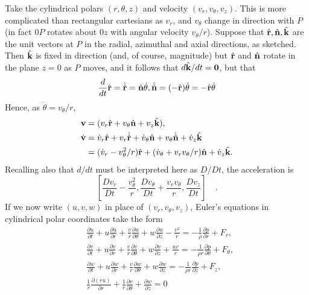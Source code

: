 \documentclass[10pt]{report}
\begin{document}
Take the cylindrical polars $(r,\theta,z)$ and velocity
$(v_r ,v_\theta ,v_z )$. This is more complicated than rectangular
cartesians as $v_{r}$, and $v_{\theta }$ change in direction with $P$ (in fact
$0P$ rotates about $0z$ with angular velocity $v_{\theta }/r$). Suppose that
${\hat {\bf r}}, {\hat {\bf n}}, {\hat {\bf k}}$ are
the unit vectors at $P$ in the radial, azimuthal and axial directions, as
sketched. Then ${\hat {\bf k}}$ is fixed in direction (and, of course,
magnitude) but ${\hat {\bf r}}$ and ${\hat {\bf n}}$ rotate in
the plane $z=0$ as $P$ moves, and it follows that $d{\hat {\bf k}}/dt =
\textbf{0}$, but that
\[
\frac{d}{dt}{{\hat {\bf r}}}={{\dot {\hat
{\bf r}}}}={{\hat {\bf n}}}\dot {\theta }, {{\dot
{\hat {\bf n}}}}=(-{{ \hat {\bf r}}})\dot {\theta
}=-{{\hat {\bf r}}}\dot {\theta }
\]
Hence, as $\dot {\theta }=v_\theta /r$,
\begin{align*}
& {{\bf v}}=(v_r {{\hat {\bf r}}}+v_\theta {{
\hat {\bf n}}}+v_z {{\hat {\bf k}}}), \\
& {{\dot {\bf v}}}=\dot {v}_r {{\hat {\bf r}}}+v_r
{{\dot {\hat {\bf r}}}}+\dot {v}_\theta {{\hat
{\bf n}}}+v_\theta {{\dot {\hat {\bf n}}}}+\dot {v}_z
{{\hat {\bf k}}} \\
& \phantom{{{\dot {\bf v}}}} =(\dot {v}_r -v_\theta ^2 /r){{\hat
{\bf r}}}+(\dot {v}_\theta +v_r v_\theta /r){{\hat {\bf n}}}+ \dot {v}_z {{\hat {\bf k}}}.
\end{align*}
Recalling also that $d/dt$ must be interpreted here as $D/Dt$, the acceleration
is
\[
\left[ {\frac{Dv_r }{Dt}-\frac{v_\theta ^2 }{r},\frac{Dv_\theta
}{Dt}+\frac{v_r v_\theta }{r},\frac{Dv_z }{Dt}} \right]\quad .
\]
If we now write $(u,v,w)$ in place of $(v_{r} ,v_{\theta } ,v_{z} )$,
Euler's equations in cylindrical polar coordinates take the form
\begin{align*}
&
\frac{\partial u}{\partial t}+u\frac{\partial u}{\partial
r}+\frac{v}{r}\frac{\partial u}{\partial \theta
}+w\frac{\partial u}{\partial
z}-\frac{v^2}{r}=-\frac{1}{\rho }\frac{\partial
p}{\partial r}+F_r ,
\\
&
\frac{\partial v}{\partial t}+u\frac{\partial v}{\partial
r}+\frac{v}{r}\frac{\partial v}{\partial \theta
}+w\frac{\partial v}{\partial z
}+\frac{uv}{r}=-\frac{1}{\rho r}\frac{\partial
p}{\partial \theta }+F_\theta ,
\\
&
\frac{\partial w}{\partial t}+u\frac{\partial w}{\partial
r}+\frac{v}{r}\frac{\partial w}{\partial \theta
}+w\frac{\partial w}{\partial z}=-\frac{1}{\rho
r}\frac{\partial p}{\partial z}+F_z , \\
& \frac{1}{r}\frac{\partial \left( {ru} \right)}{\partial
r}+\frac{1}{r}\frac{\partial v}{\partial \theta
}+\frac{\partial w}{\partial z}=0
\\
\end{align*}
\end{document}
